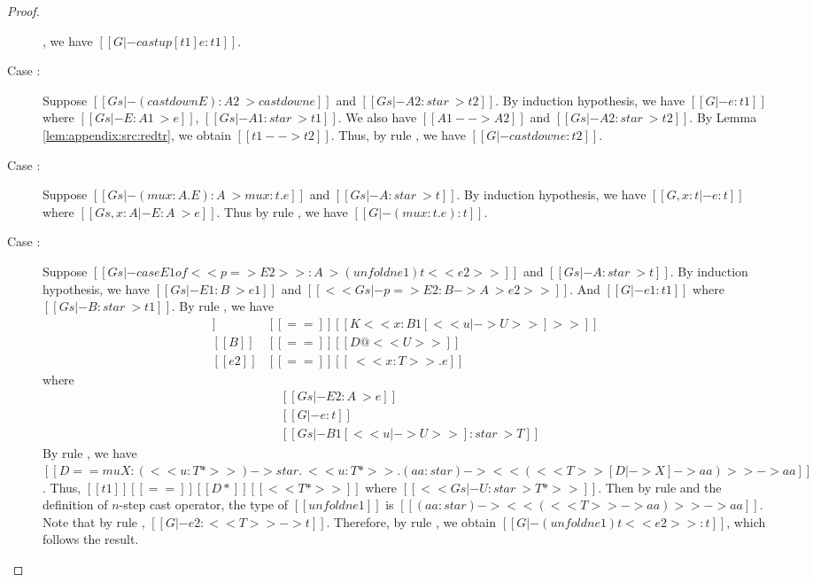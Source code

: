 \begin{proof}
\begin{description}
, we have $[[G |- castup[t1] e : t1]]$.
        \item[Case \ruleref{TR\_CastDown}:] Suppose $[[Gs |- (castdown E) : A2
~> castdown e]]$ and $[[Gs |- A2 : star ~> t2]]$. By induction hypothesis, we
have $[[G |- e : t1]]$ where $[[Gs |- E : A1 ~> e]]$, $[[Gs |- A1 : star ~>
t1]]$. We also have $[[A1 --> A2]]$ and $[[Gs |- A2 : star ~> t2]]$. By Lemma
\ref{lem:appendix:src:redtr}, we obtain $[[t1 --> t2]]$. Thus, by rule
, we have $[[G |- castdown e : t2]]$.
        \item[Case \ruleref{TR\_Mu}:] Suppose $[[Gs |- (mu x:A . E):A ~> mu
x:t.e]]$ and $[[Gs |- A : star ~> t]]$. By induction hypothesis, we have $[[G,
x : t |- e : t]]$ where $[[Gs, x:A |- E:A ~> e]]$. Thus by rule
, we have $[[G |- (mu x:t.e) : t]]$.
        \item[Case \ruleref{TR\_Case}:] Suppose $[[Gs |- case E1 of << p => E2
>> : A ~> (unfoldn e1) t <<e2>>]]$ and $[[Gs |- A : star ~> t]]$. By induction
hypothesis, we have $[[Gs |- E1 : B ~> e1]]$ and $[[<< Gs |- p => E2 : B -> A
~> e2 >>]]$. And $[[G |- e1 : t1]]$ where $[[Gs |- B : star ~> t1]]$. By rule
, we have
        \begin{align*}
            [[p]] &[[==]] [[K <<x:B1[<< u |-> U >>]>>]] \\
            [[B]] &[[==]] [[D@<<U>>]] \\
            [[e2]] &[[==]] [[\ <<x:T>> .e]]
        \end{align*}
        where
        \begin{align*}
            &[[Gs |- E2 : A ~> e]] \\
            &[[G |- e : t]] \\
            &[[Gs |- B1[<< u |-> U >>]:star ~> T ]]
        \end{align*}
        By rule , we have $[[D == mu X : (<<u:T*>>) ->
star . \ <<u:T*>> . (aa:star) -> << (<<T>>[D |-> X] -> aa) >> -> aa]]$. Thus,
$[[t1]] [[==]] [[D*]] [[<<T*>>]]$ where $[[<<Gs |- U : star ~> T*>>]]$. Then by
rule  and the definition of $n$-step cast operator, the
type of $[[unfoldn e1]]$ is $[[(aa:star) -> << (<<T>> -> aa) >> -> aa]]$. Note
that by rule , $[[G |- e2 : <<T>> -> t]]$. Therefore, by rule
, we obtain $[[G |- (unfoldn e1) t <<e2>> : t]]$, which follows
the result.
    \end{description}
\end{proof}

